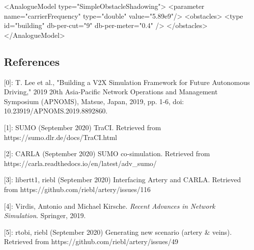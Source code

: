 \documentclass[a4paper]{article}
\begin{document}
\begin{plain}
<AnalogueModel type="SimpleObstacleShadowing">
	<parameter name="carrierFrequency" type="double" value="5.89e9"/>
	<obstacles>
		<type id="building" db-per-cut="9" db-per-meter="0.4" />
	</obstacles>
</AnalogueModel>
\end{plain}

\subsection{References}

[0]: T. Lee et al., "Building a V2X Simulation Framework for Future Autonomous Driving," 2019 20th Asia{-\allowbreak}Pacific Network Operations and Management Symposium (APNOMS), Matsue, Japan, 2019, pp. 1{-\allowbreak}6, doi: 10.23919{/\allowbreak}APNOMS.2019.8892860.

[1]: SUMO (September 2020) Tra\-CI. Retrieved from https:{/\allowbreak}{/\allowbreak}sumo.dlr.de{/\allowbreak}docs{/\allowbreak}Tra\-CI.html

[2]: CARLA (September 2020) SUMO co{-\allowbreak}simulation. Retrieved from https:{/\allowbreak}{/\allowbreak}carla.readthedocs.io{/\allowbreak}en{/\allowbreak}latest{/\allowbreak}adv{\_\allowbreak}sumo{/\allowbreak}

[3]: libertt1, riebl (September 2020) Interfacing Artery and CARLA. Retrieved from https:{/\allowbreak}{/\allowbreak}github.com{/\allowbreak}riebl{/\allowbreak}artery{/\allowbreak}issues{/\allowbreak}116

[4]: Virdis, Antonio and Michael Kirsche. \emph{Recent Advances in Network Simulation}. Springer, 2019.

[5]: rtobi, riebl (September 2020) Generating new scenario (artery \& veins). Retrieved from https:{/\allowbreak}{/\allowbreak}github.com{/\allowbreak}riebl{/\allowbreak}artery{/\allowbreak}issues{/\allowbreak}49
\end{document}
